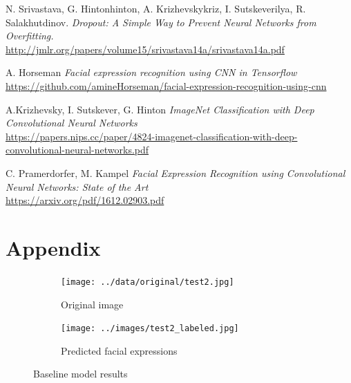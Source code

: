 \begin{thebibliography}{6}
	N. Srivastava, G. Hintonhinton, A. Krizhevskykriz, I. Sutskeverilya, R. Salakhutdinov.
	\textit{Dropout:  A Simple Way to Prevent Neural Networks from Overfitting.}\\
	\url{http://jmlr.org/papers/volume15/srivastava14a/srivastava14a.pdf}

    A. Horseman
    \textit{Facial expression recognition using CNN in Tensorflow}\\
    \url{https://github.com/amineHorseman/facial-expression-recognition-using-cnn}

    A.Krizhevsky, I. Sutskever, G. Hinton
    \textit{ImageNet Classification with Deep Convolutional Neural Networks}\\
    \url{https://papers.nips.cc/paper/4824-imagenet-classification-with-deep-convolutional-neural-networks.pdf}
    
    C. Pramerdorfer, M. Kampel
    \textit{Facial Expression Recognition using Convolutional Neural Networks: State of the Art}\\
    \url{https://arxiv.org/pdf/1612.02903.pdf}
    

\end{thebibliography}

\newpage
\appendix
\section{Appendix}

\begin{figure}[h]
	\centering
	\begin{subfigure}[h]{0.65\textwidth}
		\texttt{[image: ../data/original/test2.jpg]}
		\caption{Original image}
	\end{subfigure}\qquad
	\begin{subfigure}[h]{0.65\textwidth}
		\texttt{[image: ../images/test2\_labeled.jpg]}
		\caption{Predicted facial expressions}
	\end{subfigure}
	\caption{Baseline model results}
\end{figure}


